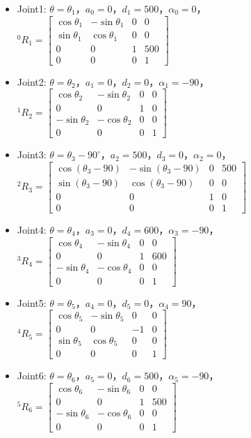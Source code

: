 \documentclass{ctexart}
\begin{document}
\begin{itemize}
	\item Joint1: $\theta = \theta_1$，$a_0=0$，$d_1=500$，$\alpha_0=0$，$^0R_1=\begin{bmatrix}
		\cos\theta_1 & -\sin\theta_1 & 0 & 0 \\
		\sin\theta_1 & \cos\theta_1 & 0 & 0 \\
		0 & 0 & 1 & 500 \\
		0 & 0 & 0 & 1
	\end{bmatrix}$
	\item Joint2: $\theta = \theta_2$，$a_1=0$，$d_2=0$，$\alpha_1=-90$，$^1R_2=\begin{bmatrix}
		\cos\theta_2 & -\sin\theta_2 & 0 & 0 \\
		0 & 0 & 1 & 0 \\
		-\sin\theta_2 & -\cos\theta_2 & 0 & 0 \\
		0 & 0 & 0 & 1
	\end{bmatrix}$
	\item Joint3: $\theta = \theta_3-90^\circ$，$a_2=500$，$d_3=0$，$\alpha_2=0$，$^2R_3=\begin{bmatrix}
		\cos(\theta_3-90) & -\sin(\theta_3-90) & 0 & 500 \\
		\sin(\theta_3-90) & \cos(\theta_3-90) & 0 & 0 \\
		0 & 0 & 1 & 0 \\
		0 & 0 & 0 & 1
	\end{bmatrix}$
	\item Joint4: $\theta = \theta_4$，$a_3=0$，$d_4=600$，$\alpha_3=-90$，$^3R_4=\begin{bmatrix}
		\cos\theta_4 & -\sin\theta_4 & 0 & 0 \\
		0 & 0 & 1 & 600 \\
		-\sin\theta_4 & -\cos\theta_4 & 0 & 0 \\
		0 & 0 & 0 & 1
	\end{bmatrix}$
	\item Joint5: $\theta = \theta_5$，$a_4=0$，$d_5=0$，$\alpha_4=90$，$^4R_5=\begin{bmatrix}
		\cos\theta_5 & -\sin\theta_5 & 0 & 0 \\
		0 & 0 & -1 & 0 \\
		\sin\theta_5 & \cos\theta_5 & 0 & 0 \\
		0 & 0 & 0 & 1
	\end{bmatrix}$
	\item Joint6: $\theta = \theta_6$，$a_5=0$，$d_6=500$，$\alpha_5=-90$，$^5R_6=\begin{bmatrix}
		\cos\theta_6 & -\sin\theta_6 & 0 & 0 \\
		0 & 0 & 1 & 500 \\
		-\sin\theta_6 & -\cos\theta_6 & 0 & 0 \\
		0 & 0 & 0 & 1
	\end{bmatrix}$
\end{itemize}
\end{document}
